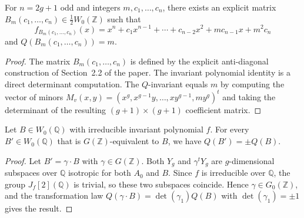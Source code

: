 \begin{lemma}
  \label{lem:matrix_construction_odd}
  For \(n=2g+1\) odd and integers \(m,c_1,\ldots,c_n\), there exists
  an explicit matrix \(B_m(c_1,\ldots,c_n)\in\tfrac{1}{2}W_0(\mathbb{Z})\)
  such that
  \[
    f_{B_m(c_1,\ldots,c_n)}(x)
    =x^n+c_1x^{n-1}+\cdots+c_{n-2}x^2+mc_{n-1}x+m^2c_n
  \]
  and \(Q(B_m(c_1,\ldots,c_n))=m\).
\end{lemma}
\begin{proof}
  The matrix \(B_m(c_1,\ldots,c_n)\) is defined by the explicit
  anti-diagonal construction of Section~2.2 of the paper.  The
  invariant polynomial identity is a direct determinant computation.
  The \(Q\)-invariant equals \(m\) by computing the vector of minors
  \(M_v(x,y)=(x^g,x^{g-1}y,\ldots,xy^{g-1},my^g)^t\) and taking
  the determinant of the resulting \((g+1)\times(g+1)\) coefficient
  matrix.
\end{proof}

\begin{lemma}
  \label{lem:extendQ_odd}
  Let \(B\in W_0(\mathbb{Q})\) with irreducible invariant polynomial
  \(f\).  For every \(B'\in W_0(\mathbb{Q})\) that is
  \(G(\mathbb{Z})\)-equivalent to \(B\), we have \(Q(B')=\pm Q(B)\).
\end{lemma}
\begin{proof}
  Let \(B'=\gamma\cdot B\) with \(\gamma\in G(\mathbb{Z})\).
  Both \(Y_g\) and \(\gamma^t Y_g\) are \(g\)-dimensional subspaces
  over \(\mathbb{Q}\) isotropic for both \(A_0\) and \(B\).  Since
  \(f\) is irreducible over \(\mathbb{Q}\), the group \(J_f[2](\mathbb{Q})\)
  is trivial, so these two subspaces coincide.  Hence
  \(\gamma\in G_0(\mathbb{Z})\), and the transformation law
  \(Q(\gamma\cdot B)=\det(\gamma_1)Q(B)\) with
  \(\det(\gamma_1)=\pm1\) gives the result.
\end{proof}

